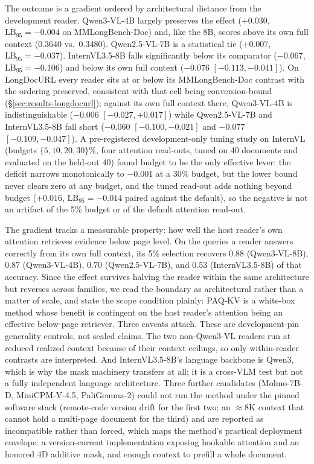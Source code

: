 \documentclass[letterpaper]{article} %
\newcommand{\paqc}{\textsc{PAQ-KV}}
\newcommand{\lb}{\mathrm{LB}_{95}}
\begin{document}
The outcome is a gradient ordered by architectural distance from the development reader. Qwen3-VL-4B largely preserves the effect ($+0.030$, $\lb=-0.004$ on MMLongBench-Doc) and, like the 8B, scores above its own full context ($0.3640$ vs.\ $0.3480$). Qwen2.5-VL-7B is a statistical tie ($+0.007$, $\lb=-0.037$). InternVL3.5-8B falls significantly below its comparator ($-0.067$, $\lb=-0.106$) and below its own full context ($-0.076$ $[-0.113,-0.041]$). On LongDocURL every reader sits at or below its MMLongBench-Doc contrast with the ordering preserved, consistent with that cell being conversion-bound (\S\ref{sec:results-longdocurl}); against its own full context there, Qwen3-VL-4B is indistinguishable ($-0.006$ $[-0.027,+0.017]$) while Qwen2.5-VL-7B and InternVL3.5-8B fall short ($-0.060$ $[-0.100,-0.021]$ and $-0.077$ $[-0.109,-0.047]$). A pre-registered development-only tuning study on InternVL (budgets $\{5,10,20,30\}\%$, four attention read-outs, tuned on 40 documents and evaluated on the held-out 40) found budget to be the only effective lever: the deficit narrows monotonically to $-0.001$ at a 30\% budget, but the lower bound never clears zero at any budget, and the tuned read-out adds nothing beyond budget ($+0.016$, $\lb=-0.014$ paired against the default), so the negative is not an artifact of the 5\% budget or of the default attention read-out.

The gradient tracks a measurable property: how well the host reader's own attention retrieves evidence below page level. On the queries a reader answers correctly from its own full context, its 5\% selection recovers $0.88$ (Qwen3-VL-8B), $0.87$ (Qwen3-VL-4B), $0.70$ (Qwen2.5-VL-7B), and $0.53$ (InternVL3.5-8B) of that accuracy. Since the effect survives halving the reader within the same architecture but reverses across families, we read the boundary as architectural rather than a matter of scale, and state the scope condition plainly: \paqc{} is a white-box method whose benefit is contingent on the host reader's attention being an effective below-page retriever. Three caveats attach. These are development-pin generality controls, not sealed claims. The two non-Qwen3-VL readers run at reduced realized context because of their context ceilings, so only within-reader contrasts are interpreted. And InternVL3.5-8B's language backbone is Qwen3, which is why the mask machinery transfers at all; it is a cross-VLM test but not a fully independent language architecture. Three further candidates (Molmo-7B-D, MiniCPM-V-4.5, PaliGemma-2) could not run the method under the pinned software stack (remote-code version drift for the first two; an ${\approx}8$K context that cannot hold a multi-page document for the third) and are reported as incompatible rather than forced, which maps the method's practical deployment envelope: a version-current implementation exposing hookable attention and an honored 4D additive mask, and enough context to prefill a whole document.
\end{document}

